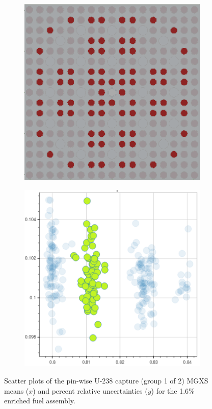 \begin{figure}[h!]
\begin{subfigure}{0.45\textwidth}
  \caption{}
  \label{fig:chap10-capt-mean-std-mgxs-2}
\end{subfigure}
\begin{subfigure}{0.45\textwidth}
  \centering
  \includegraphics[width=0.9\linewidth]{figures/unsupervised/features/assm-16/u238-capt/mean-std/geometry-4}
  \caption{}
  \label{fig:chap10-capt-mean-std-geom-3}
\end{subfigure}%
\begin{subfigure}{0.45\textwidth}
  \centering
  \includegraphics[width=0.9\linewidth]{figures/unsupervised/features/assm-16/u238-capt/mean-std/mgxs-4}
  \caption{}
  \label{fig:chap10-capt-mean-std-mgxs-3}
\end{subfigure}
\caption[Clustering of U-238 capture MGXS standard deviations]{Scatter plots of the pin-wise U-238 capture (group 1 of 2) \ac{MGXS} means ($x$) and percent relative uncertainties ($y$) for the 1.6\% enriched fuel assembly.}
\label{fig:chap10-capt-mean-std}
\end{figure}

